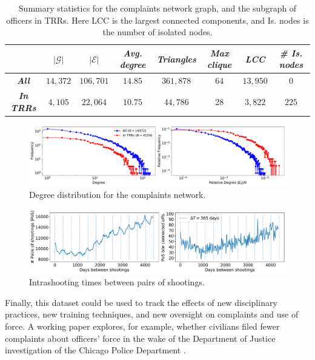 \begin{table}[h]
\begin{tabular}{c|c|c|c|c|c|c|c|}
\cline{2-8}
                                                & $|\mathcal{G}|$ & $|\mathcal{E}|$ & \textit{Avg. degree} & \textit{Triangles} & \textit{Max clique} & \textit{LCC} & \textit{\# Is. nodes} \\ \hline
\multicolumn{1}{|c|}{\textit{\textbf{All}}}     & $14{,}372$      & $106{,}701$     & $14.85$              & $361{,}878$        & $64$                & $13{,}950$   & $0$                   \\ \hline
\multicolumn{1}{|c|}{\textit{\textbf{In TRRs}}} & $4{,}105$       & $22{,}064$      & $10.75$              & $44{,}786$         & $28$                & $3{,}822$    & $225$                 \\ \hline
\end{tabular} \label{tab:stats_graphs}
\caption{Summary statistics for the complaints network graph, and the subgraph
of officers in TRRs. Here LCC is the largest connected components, and Is.
nodes is the number of isolated nodes.}\label{tab:network}
\end{table}

\begin{figure}[t!] 
	\includegraphics[width=\textwidth]{figs/degree_distribution} 
	\caption{Degree distribution for the complaints network.}
\label{fig:degree_distribution}
\end{figure}

\begin{figure}[t!] 
	\includegraphics[width=\textwidth]{figs/intrashooting_times} 
	\caption{Intrashooting times between pairs of shootings.}
\label{fig:intrashooting_time}
\end{figure}

Finally, this dataset could be used to track the effects of new disciplinary
practices, new training techniques, and new oversight on complaints and use of
force. A working paper explores, for example, whether civilians filed fewer
complaints about officers' force in the wake of the Department of Justice
investigation of the Chicago Police Department \cite{Travers20}. 

